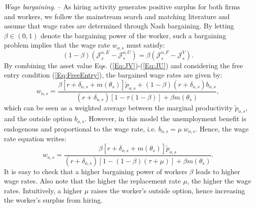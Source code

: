 \documentclass[a4paper,12pt]{article}
\begin{document}
\emph{Wage bargaining}. -- 
As hiring activity generates positive surplus for both firms and workers, we
follow the mainstream search and matching literature and assume that wage rates are
determined through Nash bargaining. By letting $\beta \in (0,1)$ denote the
bargaining power of the worker, such a bargaining problem implies that the
wage rate $w_{o,s}$ must satisfy: 
\begin{equation*}
\left( 1-\beta \right) \left( \mathcal{J}_{s}^{o,E}-\mathcal{J}%
_{s}^{o,U}\right) =\beta \left( \mathcal{J}_{s}^{o,F}-\mathcal{J}%
_{s}^{V}\right) .
\end{equation*}%
By combining the asset value Eqs. (\ref{Eq:JV})-(\ref{Eq:JU}) and considering the free entry condition (\ref{Eq:FreeEntry}), the bargained wage rates are given by: 
\begin{equation*}
w_{o,s}=\frac{\beta \left[ r+\delta _{o,s}+m\left( \theta _{s}\right) \right]
\widetilde{p}_{o,s}+\left( 1-\beta \right) \left( r+\delta _{o,s}\right) b_{o,s}}{\left(
r+\delta _{o,s}\right) \left[ 1-\tau \left( 1-\beta \right) \right] +\beta
m\left( \theta _{s}\right) },
\end{equation*}%
which can be seen as a weighted average between the marginal productivity $%
\widetilde{p}_{o,s}$, and the outside option $b_{o,s}$. However, in this model the
unemployment benefit is endogenous and proportional to the wage rate, i.e. $%
b_{o,s}=\mu \ w_{o,s}$. Hence, the wage rate equation writes: 
\begin{equation}
w_{o,s}=\frac{\beta \left[ r+\delta _{o,s}+m\left( \theta _{s}\right) \right]
\widetilde{p}_{o,s}}{\left( r+\delta _{o,s}\right) \left[ 1-\left( 1-\beta \right)
\left( \tau +\mu \right) \right] +\beta m\left( \theta _{s}\right) }.
\label{Eq:Wage}
\end{equation}%
It is easy to check that a higher bargaining power of workers $\beta $ leads to
higher wage rates. Also note that the higher the replacement rate $\mu $,
the higher the wage rates. Intuitively, a higher $\mu $ raises the
worker's outside option, hence increasing the worker's surplus from hiring.
\end{document}
